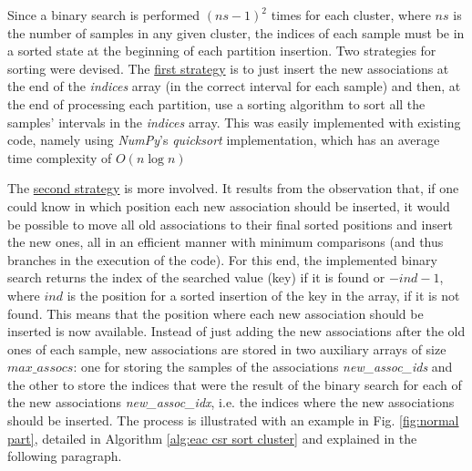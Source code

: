 Since a binary search is performed $(ns - 1)^2$ times for each cluster, where $ns$ is the number of samples in any given cluster, the indices of each sample must be in a sorted state at the beginning of each partition insertion.
Two strategies for sorting were devised.
The \underline{first strategy} is to just insert the new associations at the end of the \emph{indices} array (in the correct interval for each sample) and then, at the end of processing each partition, use a sorting algorithm to sort all the samples' intervals in the \emph{indices} array.
This was easily implemented with existing code, namely using \emph{NumPy}'s \emph{quicksort} implementation, which has an average time complexity of $O(n \log n)$

The \underline{second strategy} is more involved.
It results from the observation that, if one could know in which position each new association should be inserted, it would be possible to move all old associations to their final sorted positions and insert the new ones, all in an efficient manner with minimum comparisons (and thus branches in the execution of the code).
For this end, the implemented binary search returns the index of the searched value (key) if it is found or $-ind -1$, where $ind$ is the position for a sorted insertion of the key in the array, if it is not found.
This means that the position where each new association should be inserted is now available.
Instead of just adding the new associations after the old ones of each sample, new associations are stored in two auxiliary arrays of size $max\_assocs$: one for storing the samples of the associations \emph{new\_assoc\_ids} and the other to store the indices that were the result of the binary search for each of the new associations \emph{new\_assoc\_idx}, i.e. the indices where the new associations should be inserted.
The process is illustrated with an example in Fig. \ref{fig:normal part}, detailed in Algorithm \ref{alg:eac csr sort cluster} and explained in the following paragraph.

